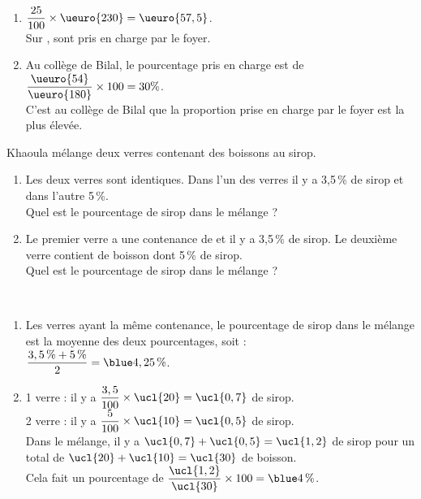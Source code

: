 \begin{colonne*exercice}
\begin{corrige}
   \ \\ [-5mm]
   \begin{enumerate}
      \item $\dfrac{25}{100}\times\ueuro{230} =\ueuro{57,5}$. \\ [2mm]
         Sur , {\blue {} sont pris en charge par le foyer}.
      \item Au collège de Bilal, le pourcentage pris en charge est de $\dfrac{\ueuro{54}}{\ueuro{180}}\times100 =30\%$. \\ [2mm]
      C'est au {\blue collège de Bilal que la proportion prise en charge par le foyer est la plus élevée}.
   \end{enumerate}
\end{corrige}

\bigskip


\begin{exercice} %
   Khaoula mélange deux verres contenant des boissons au sirop.
      \begin{enumerate}
         \item Les deux verres sont identiques. Dans l’un des verres il y a 3,5\,\% de sirop et dans l'autre 5\,\%. \\
            Quel est le pourcentage de sirop dans le mélange ?
         \item Le premier verre a une contenance de  et il y a 3,5\,\% de sirop. Le deuxième verre contient  de boisson dont 5\,\% de sirop. \\
            Quel est le pourcentage de sirop dans le mélange ?
      \end{enumerate}
\end{exercice}
   
\begin{corrige}
\ \\ [-5mm]
   \begin{enumerate}
      \item Les verres ayant la même contenance, le pourcentage de sirop dans le mélange est la moyenne des deux pourcentages, soit  : \\ [1.5mm]
         $\dfrac{3,5\,\%+5\,\%}{2} ={\blue 4,25\,\%}$.
      \item 1 verre : il y a $\dfrac{3,5}{100}\times\ucl{20} =\ucl{0,7}$ de sirop. \\ [1mm]
         2 verre : il y a $\dfrac{5}{100}\times\ucl{10} =\ucl{0,5}$ de sirop. \\ [1.5mm]
         Dans le mélange, il y a $\ucl{0,7}+\ucl{0,5} =\ucl{1,2}$ de sirop pour un total de $\ucl{20}+\ucl{10} =\ucl{30}$ de boisson. \\
         Cela fait un pourcentage de $\dfrac{\ucl{1,2}}{\ucl{30}}\times 100 ={\blue 4\,\%}$.
   \end{enumerate}
\end{corrige}


\end{colonne*exercice}
